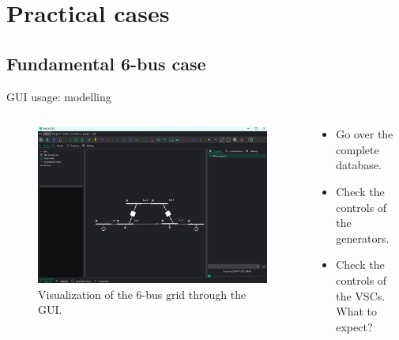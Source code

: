\section{Practical cases}

\begin{frame}{}
    \tableofcontents[currentsection]
\end{frame}

\subsection{Fundamental 6-bus case}


\begin{frame}{GUI usage: modelling}

    \begin{columns}
        \begin{column}{0.65\textwidth}
    \begin{figure}[H]
        \centering
    \includegraphics[width=0.99\textwidth]{Images/6busgui.png}
    \caption{Visualization of the 6-bus grid through the GUI.}
    \label{fig:6bus1}
    \end{figure}
        \end{column}
        
        \begin{column}{0.35\textwidth}
            \begin{itemize}
                \item Go over the complete database.
                \item Check the controls of the generators.
                \item Check the controls of the VSCs. What to expect?
            \end{itemize}
        \end{column}
    \end{columns}
\end{frame}

